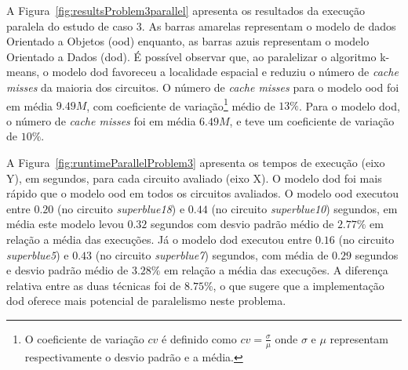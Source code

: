 A Figura~\ref{fig:resultsProblem3parallel} apresenta os resultados da execução paralela do estudo de caso 3.
As barras amarelas representam o modelo de dados Orientado a Objetos (\ac{ood}) enquanto, as barras azuis representam o modelo Orientado a Dados (\ac{dod}).
É possível observar que, ao paralelizar o algoritmo k-means, o modelo \ac{dod} favoreceu a localidade espacial e reduziu o número de  \textit{cache misses} da maioria dos circuitos.
O número de  \textit{cache misses} para o modelo \ac{ood} foi em média $9.49M$, com coeficiente de variação\footnote{O coeficiente de variação $cv$ é definido como $cv = \frac{\sigma}{\mu}$ onde $\sigma$ e $\mu$ representam respectivamente o desvio padrão e a média.} médio de $13\%$.
Para o modelo \ac{dod}, o número de  \textit{cache misses} foi em média $6.49M$, e teve um coeficiente de variação de $10\%$.





A Figura~\ref{fig:runtimeParallelProblem3} apresenta os tempos de execução (eixo Y), em segundos, para cada circuito avaliado (eixo X).
O modelo \ac{dod} foi mais rápido que o modelo \ac{ood} em todos os circuitos avaliados.
O modelo \ac{ood} executou entre $0.20$ (no circuito \textit{superblue18}) e $0.44$ (no circuito \textit{superblue10}) segundos, em média este modelo levou $0.32$ segundos com desvio padrão médio de $2.77\%$ em relação a média das execuções. 
Já o modelo \ac{dod} executou entre $0.16$ (no circuito \textit{superblue5}) e $0.43$ (no circuito \textit{superblue7}) segundos, com média de $0.29$ segundos e desvio padrão médio de $3.28\%$ em relação a média das execuções.
A diferença relativa entre as duas técnicas foi de $8.75\%$, o que sugere que a implementação dod oferece mais potencial de paralelismo neste problema.





